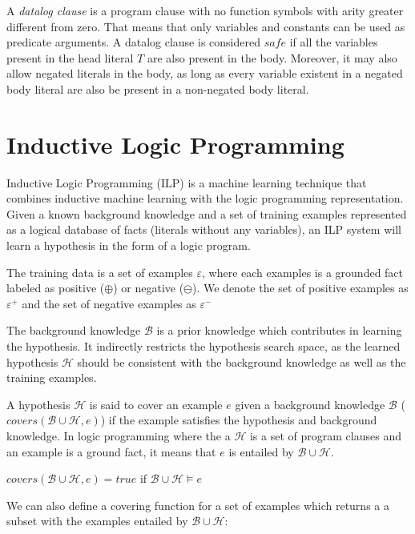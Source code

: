 A \emph{datalog clause} is a program clause with no function symbols with arity greater different from zero. That means
that only variables and constants can be used as predicate arguments. A datalog clause is considered $safe$ if all the
variables present in the head literal $T$ are also present in the body. Moreover, it may also allow negated literals in
the body, as long as every variable existent in a negated body literal are also be present in a non-negated body
literal.

\section{Inductive Logic Programming}

\cite{DBLP:journals/ml/LavracD96}
Inductive Logic Programming (ILP) is a machine learning technique that combines inductive machine learning with the
logic programming representation. Given a known background knowledge and a set of training examples represented as a
logical database of facts (literals without any variables), an ILP system will learn a hypothesis in the form of a
logic program.

The training data is a set of examples $\varepsilon$, where each examples is a grounded fact labeled as positive
($\oplus$) or negative ($\ominus$). We denote the set of positive examples as $\varepsilon^{+}$ and the set of negative
examples as $\varepsilon^{-}$

The background knowledge $\mathcal{B}$ is a prior knowledge which contributes in learning the hypothesis. It indirectly
restricts the hypothesis search space, as  the learned hypothesis $\mathcal{H}$ should be consistent with the background
knowledge as well as the training examples.

A hypothesis $\mathcal{H}$ is said to cover an example $e$ given a background knowledge $\mathcal{B}$
($covers(\mathcal{B} \cup \mathcal{H},e)$) if the example satisfies the hypothesis and background knowledge. In logic
programming where the a $\mathcal{H}$ is a set of program clauses and an example is a ground fact, it means that $e$ is
entailed by $\mathcal{B} \cup \mathcal{H}$.

\begin{center}
 $covers(\mathcal{B} \cup \mathcal{H},e)=true$ if $\mathcal{B} \cup \mathcal{H} \models e$
\end{center}

We can also define a covering function for a set of examples which returns a a subset with the examples entailed by
$\mathcal{B} \cup \mathcal{H}$:

